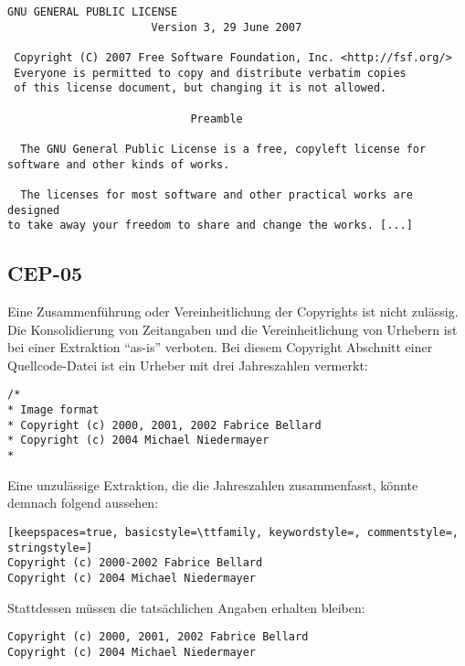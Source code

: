 \begin{lstlisting}[keepspaces=true]
                    GNU GENERAL PUBLIC LICENSE
                      Version 3, 29 June 2007

 Copyright (C) 2007 Free Software Foundation, Inc. <http://fsf.org/>
 Everyone is permitted to copy and distribute verbatim copies
 of this license document, but changing it is not allowed.

                            Preamble

  The GNU General Public License is a free, copyleft license for
software and other kinds of works.

  The licenses for most software and other practical works are designed
to take away your freedom to share and change the works. [...]
\end{lstlisting}


\subsection{CEP-05}\label{subsec:cep-05}

Eine Zusammenführung oder Vereinheitlichung der Copyrights ist nicht zulässig.
Die Konsolidierung von Zeitangaben und die Vereinheitlichung von Urhebern ist bei einer Extraktion \enquote{as-is} verboten.
Bei diesem Copyright Abschnitt einer Quellcode-Datei ist ein Urheber mit drei Jahreszahlen vermerkt:

\begin{lstlisting}[keepspaces=true]
/*
* Image format
* Copyright (c) 2000, 2001, 2002 Fabrice Bellard
* Copyright (c) 2004 Michael Niedermayer
*
\end{lstlisting}

Eine unzulässige Extraktion, die die Jahreszahlen zusammenfasst, könnte demnach folgend aussehen:

\begin{lstlisting}[keepspaces=true, basicstyle=\ttfamily, keywordstyle=, commentstyle=, stringstyle=]
Copyright (c) 2000-2002 Fabrice Bellard
Copyright (c) 2004 Michael Niedermayer
\end{lstlisting}

Stattdessen müssen die tatsächlichen Angaben erhalten bleiben:

\begin{lstlisting}[keepspaces=true, keepspaces=true]
Copyright (c) 2000, 2001, 2002 Fabrice Bellard
Copyright (c) 2004 Michael Niedermayer
\end{lstlisting}

